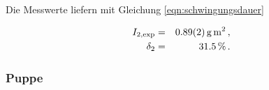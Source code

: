 				Die Messwerte liefern mit Gleichung \eqref{eqn:schwingungsdauer}

				\begin{eqnarray*}
					I_\mathrm{2, exp} & = & \SI{.89 (2)}{\gram \meter \squared} \,, \\
					\delta_2 & = & \SI{31.5}{\percent} \,.
				\end{eqnarray*}

			\clearpage
			\subsubsection{Puppe}
			\label{subsubsec:puppe}
				

